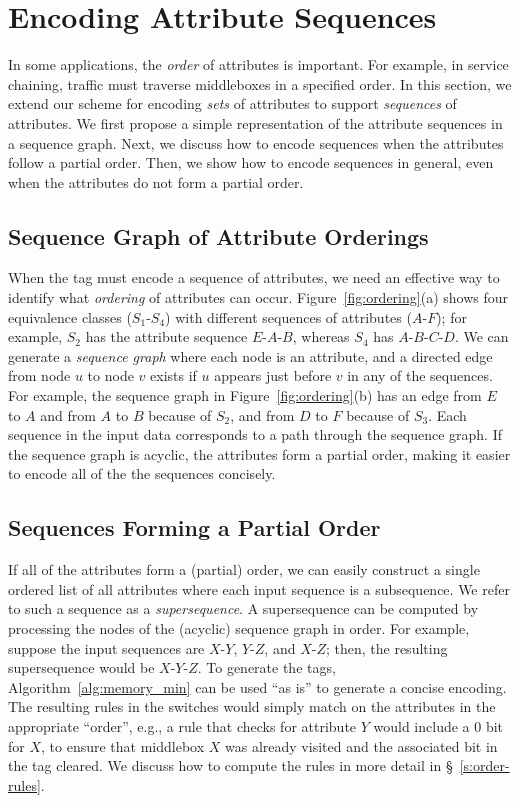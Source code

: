 \section{Encoding Attribute Sequences}
\label{sec:ordering}
In some applications, the \emph{order} of attributes is important.  For example, in service chaining, traffic must traverse middleboxes in a specified order.  In this section, we extend our scheme for encoding \emph{sets} of attributes to support \textit{sequences} of attributes.  We first propose a simple representation of the attribute sequences in a sequence graph.  Next, we discuss how to encode sequences when the attributes follow a partial order.  Then, we show how to encode sequences in general, even when the attributes do not form a partial order.

\subsection{Sequence Graph of Attribute Orderings}
When the tag must encode a sequence of attributes, we need an effective way to identify what \emph{ordering} of attributes can occur.  Figure~\ref{fig:ordering}(a) shows four equivalence classes ($S_1$-$S_4$) with different sequences of attributes ($A$-$F$); for example, $S_2$ has the attribute sequence $E$-$A$-$B$, whereas $S_4$ has $A$-$B$-$C$-$D$.  We can generate a \emph{sequence graph} where each node is an attribute, and a directed edge from node $u$ to node $v$ exists if $u$ appears just before $v$ in any of the sequences.  For example, the sequence graph in Figure~\ref{fig:ordering}(b) has an edge from $E$ to $A$ and from $A$ to $B$ because of $S_2$, and from $D$ to $F$ because of $S_3$.  Each sequence in the input data corresponds to a path through the sequence graph.  If the sequence graph is acyclic, the attributes form a partial order, making it easier to encode all of the the sequences concisely.

\subsection{Sequences Forming a Partial Order}
If all of the attributes form a (partial) order, we can easily construct a single ordered list of all attributes where each input sequence is a subsequence. We refer to such a sequence as a \emph{supersequence}.  A supersequence can be computed by processing the nodes of the (acyclic) sequence graph in order. For example, suppose the input sequences are $X$-$Y$, $Y$-$Z$, and $X$-$Z$; then, the resulting supersequence would be $X$-$Y$-$Z$. To generate the tags, Algorithm~\ref{alg:memory_min}
can be used ``as is'' to generate a concise encoding.  The resulting rules in the switches would simply match on the attributes
in the appropriate ``order'', e.g., a rule that checks for attribute $Y$ would include a $0$ bit for $X$, to ensure that middlebox $X$ was already visited and the associated bit in the tag cleared.  We discuss how to compute the rules in more detail in \S~\ref{s:order-rules}.

